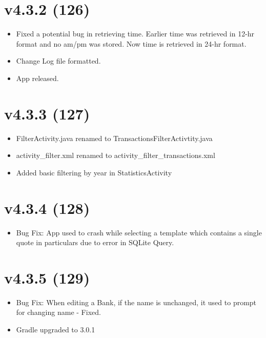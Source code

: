 \documentclass{article}
\begin{document}
    \section{v4.3.2 (126)}\label{sec:126}
    \begin{itemize}
        \item Fixed a potential bug in retrieving time.
        Earlier time was retrieved in 12-hr format and no am/pm was stored.
        Now time is retrieved in 24-hr format.
        \item Change Log file formatted.
        \item App released.
    \end{itemize}

    \section{v4.3.3 (127)}\label{sec:127}
    \begin{itemize}
        \item FilterActivity.java renamed to TransactionsFilterActivtity.java
        \item activity\_filter.xml renamed to activity\_filter\_transactions.xml
        \item Added basic filtering by year in StatisticsActivity
    \end{itemize}

    \section{v4.3.4 (128)}\label{sec:128}
    \begin{itemize}
        \item Bug Fix: App used to crash while selecting a template which contains a single quote in particulars due to error in SQLite Query.
    \end{itemize}

    \section{v4.3.5 (129)}\label{sec:129}
    \begin{itemize}
        \item Bug Fix: When editing a Bank, if the name is unchanged, it used to prompt for changing name - Fixed.
        \item Gradle upgraded to 3.0.1
    \end{itemize}
\end{document}
